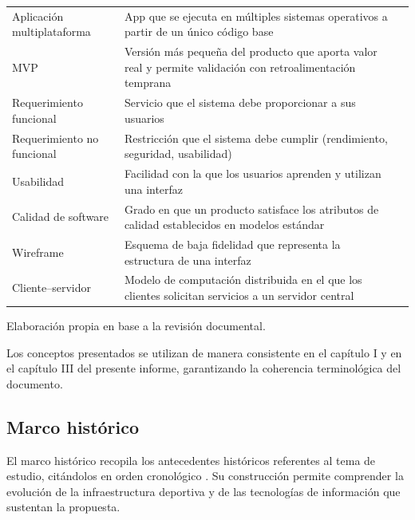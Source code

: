 \begin{table}[H]
{\begin{tablaAPA}
\begin{tabular}{@{}p{3.0cm}p{9.2cm}p{2.4cm}@{}}
      \addlinespace
      Aplicaci\'on multiplataforma &
      App que se ejecuta en m\'ultiples sistemas operativos a partir
      de un \'unico c\'odigo base &
      \citet{pressman2010} \\
      \addlinespace
      MVP &
      Versi\'on m\'as peque\~na del producto que aporta valor real y
      permite validaci\'on con retroalimentaci\'on temprana &
      \citet{larman2004} \\
      \addlinespace
      Requerimiento funcional &
      Servicio que el sistema debe proporcionar a sus usuarios &
      \citet{sommerville2011} \\
      \addlinespace
      Requerimiento no funcional &
      Restricci\'on que el sistema debe cumplir (rendimiento,
      seguridad, usabilidad) &
      \citet{sommerville2011} \\
      \addlinespace
      Usabilidad &
      Facilidad con la que los usuarios aprenden y utilizan
      una interfaz &
      \citet{nielsen1994} \\
      \addlinespace
      Calidad de software &
      Grado en que un producto satisface los atributos de calidad
      establecidos en modelos est\'andar &
      \citet{iso25010} \\
      \addlinespace
      Wireframe &
      Esquema de baja fidelidad que representa la estructura de
      una interfaz &
      \citet{pressman2010} \\
      \addlinespace
      Cliente--servidor &
      Modelo de computaci\'on distribuida en el que los clientes
      solicitan servicios a un servidor central &
      \citet{sommerville2011} \\
      \bottomrule
    \end{tabular}
    \end{tablaAPA}%
  }{Elaboraci\'on propia en base a la revisi\'on documental.}
\end{table}

Los conceptos presentados se utilizan de manera consistente en el cap\'itulo I
y en el cap\'itulo III del presente informe, garantizando la coherencia
terminol\'ogica del documento.

\subsection{Marco hist\'orico}

El marco hist\'orico recopila los antecedentes hist\'oricos referentes al tema
de estudio, cit\'andolos en orden cronol\'ogico \citep{arias2012}. Su
construcci\'on permite comprender la evoluci\'on de la infraestructura deportiva
y de las tecnolog\'ias de informaci\'on que sustentan la propuesta.

